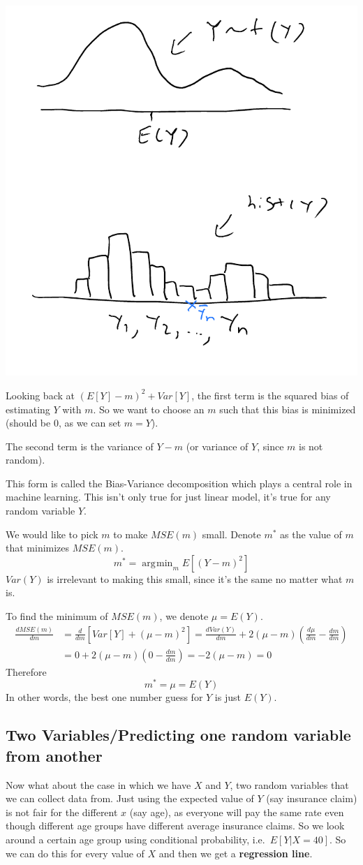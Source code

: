 \documentclass[12 pt]{article}
\DeclareMathOperator*{\argmin}{arg\!\min}
\begin{document}
\includegraphics[width=.7\textwidth]{1.pdf}

Looking back at $(E[Y]-m)^2 + Var[Y]$, the first term is the squared
bias of estimating $Y$ with $m$. So we want to choose an $m$ such that
this bias is minimized (should be $0$, as we can set $m=Y$).

The second term is the variance of $Y-m$ (or variance of $Y$, since
$m$ is not random).

This form is called the Bias-Variance decomposition which plays a
central role in machine learning. This isn't only true for just linear
model, it's true for any random variable $Y$.

We would like to pick $m$ to make $MSE(m)$ small. Denote $m^*$ as the
value of $m$ that minimizes $MSE(m)$.
$$m^* = \argmin_m E[(Y-m)^2]$$
$Var(Y)$ is irrelevant to making this small, since it's the same no
matter what $m$ is.

To find the minimum of $MSE(m)$, we denote $\mu = E(Y)$.
\begin{align*}
  \frac{dMSE(m)}{dm} & = \frac{d}{dm} \left[Var[Y] + (\mu - m)^2\right] = \frac{dVar(Y)}{dm} + 2(\mu-m) \left(\frac{d\mu}{dm} - \frac{dm}{dm}\right)
  \\ & = 0 + 2(\mu - m) \left(0 - \frac{dm}{dm}\right) = - 2(\mu - m) = 0
\end{align*}
Therefore
$$m^* = \mu = E(Y)$$
In other words, the best one number guess for $Y$ is just $E(Y)$.

\subsection{Two Variables/Predicting one random variable from another}
Now what about the case in which we have $X$ and $Y$, two random
variables that we can collect data from. Just using the expected value
of $Y$ (say insurance claim) is not fair for the different $x$ (say
age), as everyone will pay the same rate even though different age
groups have different average insurance claims. So we look around a
certain age group using conditional probability, i.e.\ $E[Y|X =
40]$. So we can do this for every value of $X$ and then we get a
\textbf{regression line}.
\end{document}
